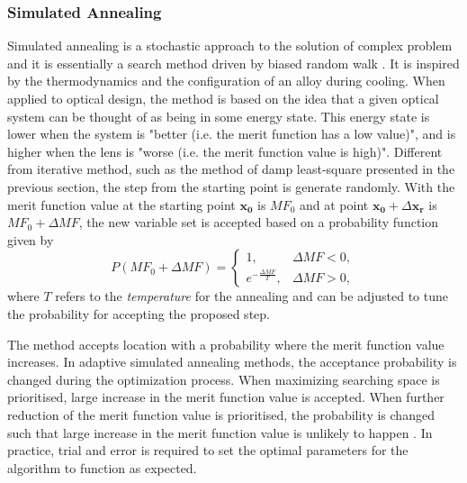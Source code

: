\subsubsection{Simulated Annealing}
Simulated annealing is a stochastic approach to the solution of complex problem and it is essentially a search method driven by biased random walk \cite{WELLER:87}. It is inspired by the thermodynamics and the configuration of an alloy during cooling. When applied to optical design, the method is based on the idea that a given optical system can be thought of as being in some energy state. This energy state is lower when the system is "better (i.e. the merit function has a low value)", and is higher when the lens is "worse (i.e. the merit function value is high)". Different from iterative method, such as the method of damp least-square presented in the previous section, the step from the starting point is generate randomly. With the merit function value at the starting point $\pmb{x_0}$ is $MF_0$ and at point $\pmb{x_0} + \Delta\pmb{x_r}$ is $MF_0 + \Delta MF$, the new variable set is accepted based on a probability function \cite{Forbes1991} given by 
\begin{equation} \label{eq: simualted_annealing_probability }
P(MF_0 + \Delta MF) = 
\begin{cases}
  1, & \Delta MF < 0, \\ 
 e^{-\frac{\Delta MF}{T}}, & \Delta MF > 0,
\end{cases}
\end{equation}where $T$ refers to the \textit{temperature} for the annealing and can be adjusted to tune the probability for accepting the proposed step. 

The method accepts location with a probability where the merit function value increases. In adaptive simulated annealing methods, the acceptance probability is changed during the optimization process. When maximizing searching space is prioritised, large increase in the merit function value is accepted. When further reduction of the merit function value is prioritised, the probability is changed such that large increase in the merit function value is unlikely to happen \cite{Forbes1991}. In practice, trial and error is required to set the optimal parameters for the algorithm to function as expected.    

